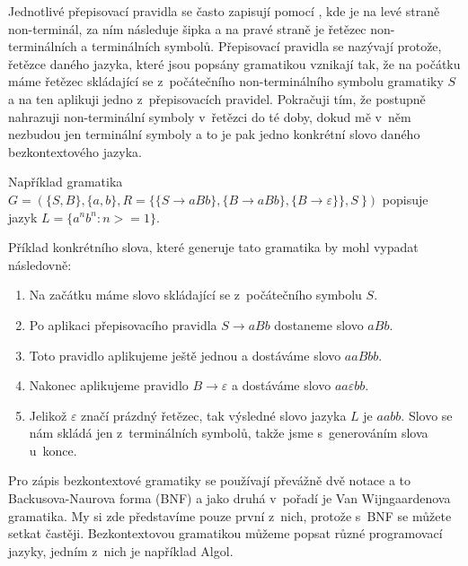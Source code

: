 Jednotlivé přepisovací pravidla se často zapisují pomocí , kde je na levé straně non-terminál, za ním následuje šipka a na pravé straně je řetězec non-terminálních a terminálních symbolů. Přepisovací pravidla se nazývají protože, řetězce daného jazyka, které jsou popsány gramatikou vznikají tak, že na počátku máme řetězec skládající se z~počátečního non-terminálního symbolu gramatiky \(S\) a na ten aplikuji jedno z~přepisovacích pravidel. Pokračuji tím, že postupně nahrazuji non-terminální symboly v~řetězci do té doby, dokud mě v~něm nezbudou jen terminální symboly a to je pak jedno konkrétní slovo daného bezkontextového jazyka.

Například gramatika \( G = (\{S, B\}, \{ a, b\}, R = \{\{S \rightarrow aBb\}, \{B \rightarrow aBb\},\{B \rightarrow \varepsilon\}\}, S~\}) \) popisuje jazyk \( L = \{ a^n b^n : n >= 1 \}  \).

Příklad konkrétního slova, které generuje tato gramatika by mohl vypadat následovně:
\begin{enumerate}
	\item Na začátku máme slovo skládající se z~počátečního symbolu \(S\).
	\item Po aplikaci přepisovacího pravidla \(S \rightarrow aBb\) dostaneme slovo \(aBb\).
	\item Toto pravidlo aplikujeme ještě jednou a dostáváme slovo \(aaBbb\).
	\item Nakonec aplikujeme pravidlo \(B \rightarrow \varepsilon \) a dostáváme slovo \(aa\varepsilon bb\).
	\item Jelikož \(\varepsilon\) značí prázdný řetězec, tak výsledné slovo jazyka \(L\) je \(aabb\). Slovo se nám skládá jen z~terminálních symbolů, takže jsme s~generováním slova u~konce.
\end{enumerate}

Pro zápis bezkontextové gramatiky se používají převážně dvě notace a to Backusova-Naurova forma (BNF) a jako druhá v~pořadí je Van Wijngaardenova gramatika. My si zde představíme pouze první z~nich, protože s~BNF se můžete setkat častěji. Bezkontextovou gramatikou můžeme popsat různé programovací jazyky, jedním z~nich je například Algol. \cite{CFG}

